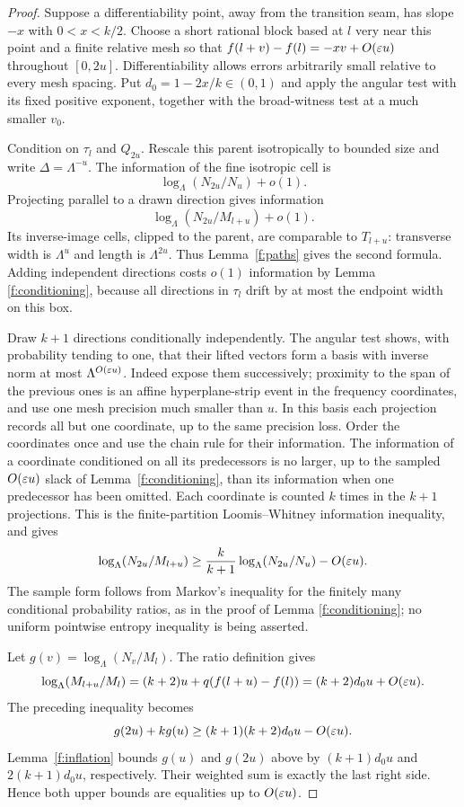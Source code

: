 \begin{proof}
Suppose a differentiability point, away from the transition seam,
has slope $-x$ with $0<x<k/2$. Choose a short rational block based at
$l$ very near this point and a finite relative mesh so that
$f(l+v)-f(l)=-xv+O(\varepsilon u)$ throughout $[0,2u]$. Differentiability
allows errors arbitrarily small relative to every mesh spacing.
Put $d_0=1-2x/k\in(0,1)$ and apply the angular test with its fixed
positive exponent, together with the broad-witness test at a much
smaller $v_0$.

Condition on $\tau_l$ and $Q_{2u}$. Rescale this parent isotropically
to bounded size and write $\Delta=\Lambda^{-u}$. The information of
the fine isotropic cell is
\[
 \log_\Lambda(N_{2u}/N_u)+o(1).
\]
Projecting parallel to a drawn direction gives information
\[
 \log_\Lambda(N_{2u}/M_{l+u})+o(1).
\]
Its inverse-image cells, clipped to the parent, are comparable to
$T_{l+u}$: transverse width is $\Lambda^u$ and length is
$\Lambda^{2u}$. Thus Lemma~\ref{f:paths} gives the second formula.
Adding independent directions costs $o(1)$ information by Lemma
\ref{f:conditioning}, because all directions in $\tau_l$ drift by
at most the endpoint width on this box.

Draw $k+1$ directions conditionally independently. The angular test
shows, with probability tending to one, that their lifted vectors
form a basis with inverse norm at most $\Lambda^{O(\varepsilon u)}$.
Indeed expose them successively; proximity to the span of the
previous ones is an affine hyperplane-strip event in the frequency
coordinates, and use one mesh precision much smaller than $u$.
In this basis each projection records all but one coordinate, up
to the same precision loss. Order the coordinates once and use
the chain rule for their information. The information of a
coordinate conditioned on all its predecessors is no larger,
up to the sampled $O(\varepsilon u)$ slack of Lemma~\ref{f:conditioning},
than its information when one predecessor has been omitted.
Each coordinate is counted $k$ times in the $k+1$ projections.
This is the finite-partition Loomis--Whitney information inequality,
and gives
\[
 \log_\Lambda(N_{2u}/M_{l+u})
 \ge\frac{k}{k+1}\log_\Lambda(N_{2u}/N_u)-O(\varepsilon u).
\]
The sample form follows from Markov's inequality for the finitely
many conditional probability ratios, as in the proof of Lemma
\ref{f:conditioning}; no uniform pointwise entropy inequality is
being asserted.

Let $g(v)=\log_\Lambda(N_v/M_l)$. The ratio definition gives
\[
 \log_\Lambda(M_{l+u}/M_l)
 =(k+2)u+q(f(l+u)-f(l))=(k+2)d_0u+O(\varepsilon u).
\]
The preceding inequality becomes
\[
 g(2u)+kg(u)\ge(k+1)(k+2)d_0u-O(\varepsilon u).
\]
Lemma~\ref{f:inflation} bounds $g(u)$ and $g(2u)$ above by
$(k+1)d_0u$ and $2(k+1)d_0u$, respectively. Their weighted sum is
exactly the last right side. Hence both upper bounds are equalities
up to $O(\varepsilon u)$.


\end{proof}
